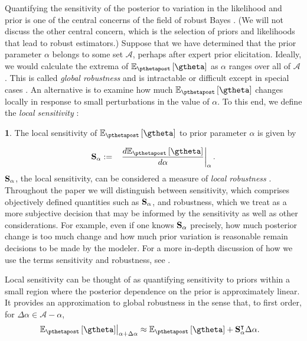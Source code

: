 \documentclass{article}\usepackage[]{graphicx}\usepackage[]{color}
\theoremstyle{plain}
\theoremstyle{definition}
\newtheorem{defn}[thm]{\protect\definitionname}
\theoremstyle{plain}
\theoremstyle{plain}
\theoremstyle{plain}
\theoremstyle{plain}
\providecommand{\definitionname}{Definition}
\begin{document}
Quantifying the sensitivity of the posterior to variation in the likelihood
and prior is one of the central concerns of the field of robust Bayes
\citep{berger:2012:robust}. (We will not discuss the other central
concern, which is the selection of priors and likelihoods that lead
to robust estimators.) Suppose that we have determined that the prior
parameter $\alpha$ belongs to some set $\mathcal{A}$, perhaps after
expert prior elicitation. Ideally, we would calculate the extrema
of $\epgtheta$ as $\alpha$ ranges over all of $\mathcal{A}$. This
is called \textit{global robustness} and is intractable or difficult
except in special cases \citep[Chapter 15]{moreno:2012:globalrobustness,huber:2011:robust}.
An alternative is to examine how much $\epgtheta$ changes locally
in response to small perturbations in the value of $\alpha$. To this
end, we define the \textit{local sensitivity} \citep{gustafson:2012:localrobustnessbook}:
\begin{defn}
The local sensitivity of $\epgtheta$ to prior parameter $\alpha$
is given by

\begin{eqnarray}
\psens & := & \left.\frac{d\epgtheta}{d\alpha}\right|_{\alpha}.\label{eq:local_robustness}
\end{eqnarray}
$\mathbf{S}_{\alpha}$, the local sensitivity, can be considered a measure of\emph{
local robustness} \citep{gustafson:2012:localrobustnessbook}. Throughout
the paper we will distinguish between sensitivity, which comprises
objectively defined quantities such as $\mathbf{S}_{\alpha}$, and robustness,
which we treat as a more subjective decision that may be informed
by the sensitivity as well as other considerations. For example, even
if one knows $\mathbf{S}_{\alpha}$ precisely, how much posterior change is too
much change and how much prior variation is reasonable remain decisions
to be made by the modeler. For a more in-depth discussion of how we
use the terms sensitivity and robustness, see .

 Local sensitivity can be thought of as quantifying sensitivity to
priors within a small region where the posterior dependence on the
prior is approximately linear. It provides an approximation to global
robustness in the sense that, to first order, for $\Delta\alpha\in\mathcal{A}-\alpha$,
\begin{align*}
\left.\epgtheta\right|_{\alpha+\Delta\alpha} & \approx\epgtheta+\psens^{\trans}\Delta\alpha.
\end{align*}
\end{defn}
\end{document}
